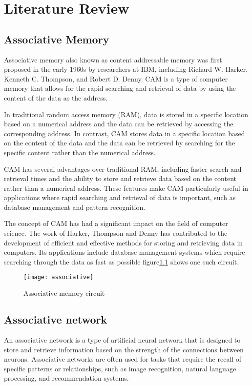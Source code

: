 \chapter{Literature Review}

\section{Associative Memory}
Associative memory also known as content addressable memory was first proposed
in the early 1960s by researchers at IBM, including Richard W. Harker, Kenneth
C. Thompson, and Robert D. Denny. CAM is a type of computer memory that allows
for the rapid searching and retrieval of data by using the content of the data
as the address.

In traditional random access memory (RAM), data is stored in a specific
location based on a numerical address and the data can be retrieved by
accessing the corresponding address. In contrast, CAM stores data in a specific
location based on the content of the data and the data can be retrieved by
searching for the specific content rather than the numerical address.

CAM has several advantages over traditional RAM, including faster search and
retrieval times and the ability to store and retrieve data based on the content
rather than a numerical address. These features make CAM particularly useful in
applications where rapid searching and retrieval of data is important, such as
database management and pattern recognition.

The concept of CAM has had a significant impact on the field of computer
science. The work of Harker, Thompson and Denny has contributed to the
development of efficient and effective methods for storing and retrieving data
in computers. Its applications include database management systems which
require searching through the data as fast as possible
figure\ref{associative_circuit} shows one such circuit.
\begin{figure}[h!]
    \centering
    \texttt{[image: associative]}
    \caption{Associative memory circuit}\label{associative_circuit}
\end{figure}

\section{Associative network}
An associative network is a type of artificial neural network that is designed
to store and retrieve information based on the strength of the connections
between neurons. Associative networks are often used for tasks that require the
recall of specific patterns or relationships, such as image recognition,
natural language processing, and recommendation systems.
